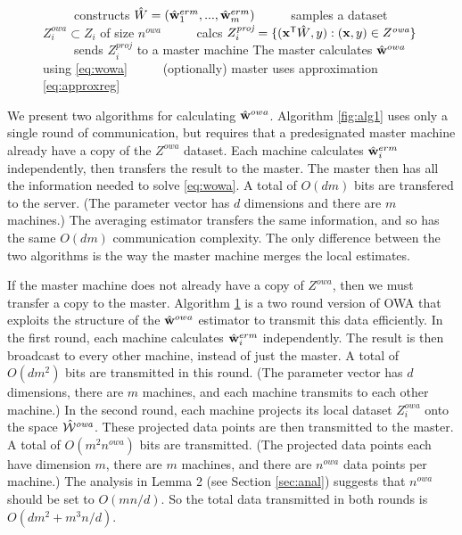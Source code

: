 \documentclass[thesis.tex]{subfiles}
\newcommand{\Zproj}{Z^{\textit{proj}}}
\newcommand{\Zowa}{Z^{\textit{owa}}}
\newcommand{\nowa}{n^{\textit{owa}}}
\begin{document}
\begin{wrapfigure}{R}{0.475\textwidth}
\begin{minipage}{0.475\textwidth}
\begin{algorithm}[H]
\begin{algorithmic}
    \State \hspace{-0.1in}~~~~~constructs $\hat W=(\hat{\mathbf w}^{erm}_1,...,\hat{\mathbf w}^{erm}_m)$
    \State \hspace{-0.1in}~~~~~samples a dataset $\Zowa_i\subset Z_i$ of size $\nowa$
    \State \hspace{-0.1in}~~~~~calcs $\Zproj_i=\{(\trans\x\matW,y) : (\x,y)\in\Zowa\}$
    \State \hspace{-0.1in}~~~~~sends $\Zproj_i$ to a master machine
    \State \hspace{-0.1in}The master calculates $\hat{\mathbf w}^{owa}$ using \eqref{eq:wowa} %
    \State \hspace{-0.1in}~~~~~(optionally) master uses approximation \eqref{eq:approxreg}
\end{algorithmic}
\label{fig:alg2}
\end{algorithm}
\end{minipage}
\vspace{-0.20in}
\end{wrapfigure}

We present two algorithms for calculating $\hat{\mathbf w}^{owa}$.
Algorithm \ref{fig:alg1} uses only a single round of communication, 
but requires that a predesignated master machine already have a copy of the $\Zowa$ dataset.
Each machine calculates $\hat{\mathbf w}^{erm}_i$ independently,
then transfers the result to the master.
The master then has all the information needed to solve \eqref{eq:wowa}. 
A total of $O(dm)$ bits are transfered to the server.
(The parameter vector has $d$ dimensions and there are $m$ machines.)
The averaging estimator transfers the same information,
and so has the same $O(dm)$ communication complexity.
The only difference between the two algorithms is the way the master machine merges the local estimates.

If the master machine does not already have a copy of $\Zowa$,
then we must transfer a copy to the master. 
Algorithm \ref{fig:alg2} is a two round version of OWA that exploits the structure of the $\hat{\mathbf w}^{owa}$ estimator to transmit this data efficiently.
In the first round, each machine calculates $\hat{\mathbf w}^{erm}_i$ independently.
The result is then broadcast to every other machine, instead of just the master.
A total of $O(dm^2)$ bits are transmitted in this round.
(The parameter vector has $d$ dimensions,
there are $m$ machines,
and each machine transmits to each other machine.)
In the second round, each machine projects its local dataset $\Zowa_i$ onto the space ${\hat {{\mathcal W}}^{\textit{owa}}}$.
These projected data points are then transmitted to the master.
A total of $O(m^2\nowa)$ bits are transmitted.
(The projected data points each have dimension $m$, 
there are $m$ machines,
and there are $\nowa$ data points per machine.)
The analysis in Lemma 2 (see Section \ref{sec:anal}) suggests that $\nowa$ should be set to $O(mn/d)$.
So the total data transmitted in both rounds is $O(dm^2 + m^3n/d)$. 
\end{document}
